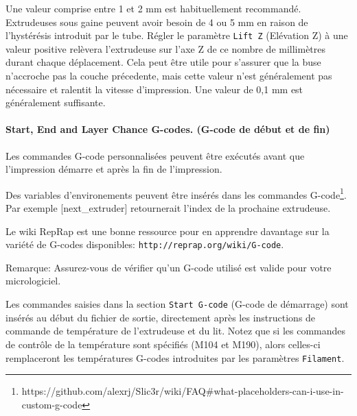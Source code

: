 Une valeur comprise entre 1 et 2 mm est habituellement recommand\'e. Extrudeuses sous gaine peuvent avoir besoin de 4 ou 5 mm en raison de l'hyst\'er\'esis introduit par le tube.
R\'egler le param\`etre \texttt{Lift Z} (El\'evation Z) \`a une valeur positive rel\`evera l'extrudeuse sur l'axe Z de ce nombre de millim\`etres durant chaque d\'eplacement. Cela peut \^etre utile pour s'assurer que la buse n'accroche pas la couche pr\'ecedente, mais cette valeur n'est g\'en\'eralement pas n\'ecessaire et ralentit la vitesse d'impression. Une valeur de 0,1 mm est g\'en\'eralement suffisante.

\paragraph{Start, End and Layer Chance G-codes. (G-code de d\'ebut et de fin)} %
\label{par:start_end_g_code}
Les commandes G-code personnalis\'ees peuvent \^etre ex\'ecut\'es avant que l'impression d\'emarre et apr\`es la fin de l'impression.

Des variables d'environements peuvent \^etre ins\'er\'es dans les commandes G-code\footnote{https://github.com/alexrj/Slic3r/wiki/FAQ\#what-placeholders-can-i-use-in-custom-g-code}.  Par exemple [next\_extruder] retournerait l'index de la prochaine extrudeuse.

Le wiki RepRap est une bonne ressource pour en apprendre davantage sur la vari\'et\'e de G-codes disponibles: \texttt{http://reprap.org/wiki/G-code}.

Remarque: Assurez-vous de v\'erifier qu'un G-code utilis\'e est valide pour votre micrologiciel.

Les commandes saisies dans la section \texttt{Start G-code} (G-code de d\'emarrage) 
sont ins\'er\'es au d\'ebut du fichier de sortie, directement apr\`es les instructions de commande de temp\'erature de l'extrudeuse et du lit. Notez que si les commandes de contr\^ole de la temp\'erature sont sp\'ecifi\'es (M104 et M190), alors celles-ci remplaceront les temp\'eratures G-codes introduites par les param\`etres \texttt{Filament}.

